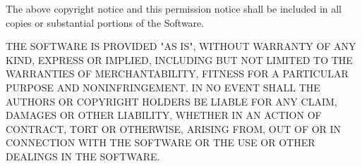 \documentclass[a4paper,10pt]{report}
\begin{document}
The above copyright notice and this permission notice shall be
included in all
copies or substantial portions of the Software.

THE SOFTWARE IS PROVIDED "AS IS", WITHOUT WARRANTY OF ANY KIND,
EXPRESS OR IMPLIED, INCLUDING BUT NOT LIMITED TO THE WARRANTIES
OF MERCHANTABILITY, FITNESS FOR A PARTICULAR PURPOSE AND NONINFRINGEMENT.
IN NO EVENT SHALL THE AUTHORS OR COPYRIGHT HOLDERS BE LIABLE
FOR ANY CLAIM, DAMAGES OR OTHER LIABILITY, WHETHER IN AN ACTION
OF CONTRACT, TORT OR OTHERWISE, ARISING FROM, OUT OF OR IN CONNECTION
WITH THE SOFTWARE OR THE USE OR OTHER DEALINGS IN THE SOFTWARE.
\end{document}
